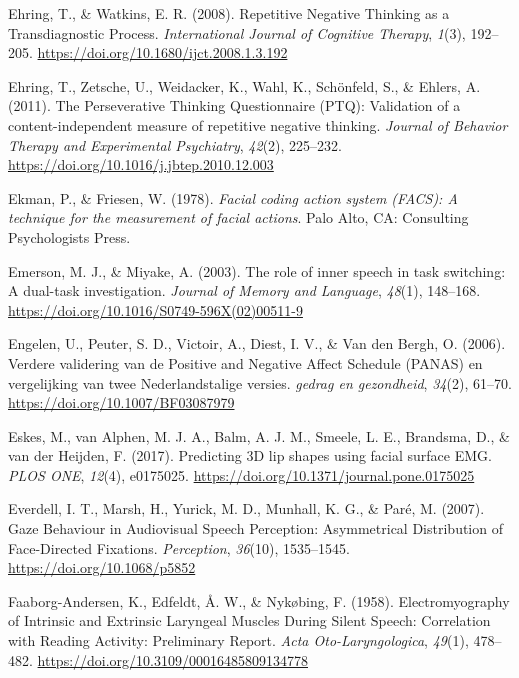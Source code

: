 \documentclass[a4paper,12pt,twoside,onecolumn,openright,final,oldfontcommands]{memoir}
\begin{document}
\leavevmode\hypertarget{ref-ehring_repetitive_2008}{}%
Ehring, T., \& Watkins, E. R. (2008). Repetitive Negative Thinking as a Transdiagnostic Process. \emph{International Journal of Cognitive Therapy}, \emph{1}(3), 192--205. \url{https://doi.org/10.1680/ijct.2008.1.3.192}

\leavevmode\hypertarget{ref-Ehring2011}{}%
Ehring, T., Zetsche, U., Weidacker, K., Wahl, K., Schönfeld, S., \& Ehlers, A. (2011). The Perseverative Thinking Questionnaire (PTQ): Validation of a content-independent measure of repetitive negative thinking. \emph{Journal of Behavior Therapy and Experimental Psychiatry}, \emph{42}(2), 225--232. \url{https://doi.org/10.1016/j.jbtep.2010.12.003}

\leavevmode\hypertarget{ref-ekman_facial_1978}{}%
Ekman, P., \& Friesen, W. (1978). \emph{Facial coding action system (FACS): A technique for the measurement of facial actions}. Palo Alto, CA: Consulting Psychologists Press.

\leavevmode\hypertarget{ref-emerson_role_2003}{}%
Emerson, M. J., \& Miyake, A. (2003). The role of inner speech in task switching: A dual-task investigation. \emph{Journal of Memory and Language}, \emph{48}(1), 148--168. \url{https://doi.org/10.1016/S0749-596X(02)00511-9}

\leavevmode\hypertarget{ref-engelen_verdere_2006}{}%
Engelen, U., Peuter, S. D., Victoir, A., Diest, I. V., \& Van den Bergh, O. (2006). Verdere validering van de Positive and Negative Affect Schedule (PANAS) en vergelijking van twee Nederlandstalige versies. \emph{gedrag en gezondheid}, \emph{34}(2), 61--70. \url{https://doi.org/10.1007/BF03087979}

\leavevmode\hypertarget{ref-eskes_predicting_2017}{}%
Eskes, M., van Alphen, M. J. A., Balm, A. J. M., Smeele, L. E., Brandsma, D., \& van der Heijden, F. (2017). Predicting 3D lip shapes using facial surface EMG. \emph{PLOS ONE}, \emph{12}(4), e0175025. \url{https://doi.org/10.1371/journal.pone.0175025}

\leavevmode\hypertarget{ref-everdell_gaze_2007}{}%
Everdell, I. T., Marsh, H., Yurick, M. D., Munhall, K. G., \& Paré, M. (2007). Gaze Behaviour in Audiovisual Speech Perception: Asymmetrical Distribution of Face-Directed Fixations. \emph{Perception}, \emph{36}(10), 1535--1545. \url{https://doi.org/10.1068/p5852}

\leavevmode\hypertarget{ref-faaborg-andersen_electromyography_1958}{}%
Faaborg-Andersen, K., Edfeldt, Å. W., \& Nykøbing, F. (1958). Electromyography of Intrinsic and Extrinsic Laryngeal Muscles During Silent Speech: Correlation with Reading Activity: Preliminary Report. \emph{Acta Oto-Laryngologica}, \emph{49}(1), 478--482. \url{https://doi.org/10.3109/00016485809134778}
\end{document}
